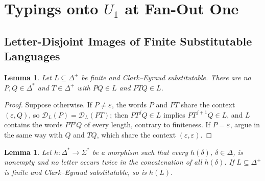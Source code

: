 \documentclass[11pt]{article}
\numberwithin{equation}{section}
\theoremstyle{plain}
\newtheorem{lemma}[theorem]{Lemma}
\theoremstyle{definition}
\theoremstyle{remark}
\newcommand{\D}{\mathcal{D}}
\newcommand{\eps}{\varepsilon}
\theoremstyle{plain}
\begin{document}
\section{Typings onto \texorpdfstring{$U_1$}{U1} at Fan-Out One}
\label{app:u1-typings}

\subsection{Letter-Disjoint Images of Finite Substitutable Languages}

\begin{lemma}\label{lem:app-u1-insertion}
Let $L\subseteq\Delta^+$ be finite and Clark--Eyraud substitutable.  There are no
$P,Q\in\Delta^*$ and $T\in\Delta^+$ with $PQ\in L$ and $PTQ\in L$.
\end{lemma}

\begin{proof}
Suppose otherwise.  If $P\ne\eps$, the words $P$ and $PT$ share the context
$(\eps,Q)$, so $\D_L(P)=\D_L(PT)$; then $PT^jQ\in L$ implies $PT^{j+1}Q\in L$, and
$L$ contains the words $PT^jQ$ of every length, contrary to finiteness.  If
$P=\eps$, argue in the same way with $Q$ and $TQ$, which share the context
$(\eps,\eps)$.
\end{proof}

\begin{lemma}\label{lem:app-u1-code}
Let $h:\Delta^*\to\Sigma^*$ be a morphism such that every $h(\delta)$,
$\delta\in\Delta$, is nonempty and no letter occurs twice in the concatenation of
all $h(\delta)$.  If $L\subseteq\Delta^+$ is finite and Clark--Eyraud
substitutable, so is $h(L)$.
\end{lemma}
\end{document}
